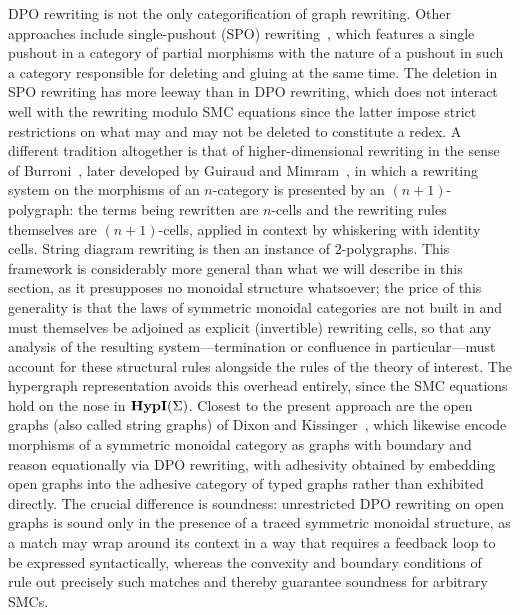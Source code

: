 DPO rewriting is not the only categorification of graph rewriting.
Other approaches include single-pushout (SPO) rewriting~\cite{HandbookGraphGrammars2003}, which features a single pushout in a category of partial morphisms with the nature of a pushout in such a category responsible for deleting and gluing at the same time.
The deletion in SPO rewriting has more leeway than in DPO rewriting, which does not interact well with the rewriting modulo SMC equations since the latter impose strict restrictions on what may and may not be deleted to constitute a redex.
A different tradition altogether is that of higher-dimensional rewriting in the sense of Burroni~\cite{burroniHigherdimensionalWordProblems1993}, later developed by Guiraud and Mimram~\cite{guiraudTerminationOrdersThreedimensional2006,mimram3DimensionalRewritingTheory2014}, in which a rewriting system on the morphisms of an $n$-category is presented by an $(n+1)$-polygraph: the terms being rewritten are $n$-cells and the rewriting rules themselves are $(n+1)$-cells, applied in context by whiskering with identity cells.
String diagram rewriting is then an instance of $2$-polygraphs.
This framework is considerably more general than what we will describe in this section, as it presupposes no monoidal structure whatsoever; the price of this generality is that the laws of symmetric monoidal categories are not built in and must themselves be adjoined as explicit (invertible) rewriting cells, so that any analysis of the resulting system---termination or confluence in particular---must account for these structural rules alongside the rules of the theory of interest.
The hypergraph representation avoids this overhead entirely, since the SMC equations hold on the nose in $\mathbf{HypI}(\Sigma)$.
Closest to the present approach are the open graphs (also called string graphs) of Dixon and Kissinger~\cite{dixonOpengraphsMonoidalTheories2013}, which likewise encode morphisms of a symmetric monoidal category as graphs with boundary and reason equationally via DPO rewriting, with adhesivity obtained by embedding open graphs into the adhesive category of typed graphs rather than exhibited directly.
The crucial difference is soundness: unrestricted DPO rewriting on open graphs is sound only in the presence of a traced symmetric monoidal structure, as a match may wrap around its context in a way that requires a feedback loop to be expressed syntactically, whereas the convexity and boundary conditions of~\cite{bonchi_string_2022-2} rule out precisely such matches and thereby guarantee soundness for arbitrary SMCs.


